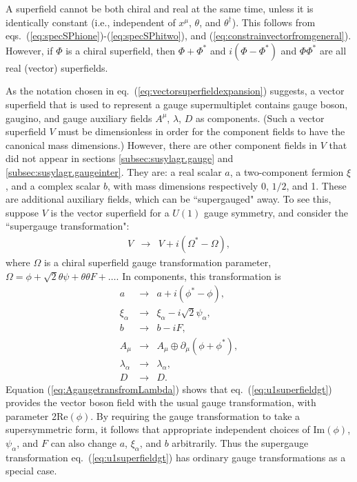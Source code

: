 \documentclass[12pt]{article}
\def\BDminus{-}
\def\BDminus{+}
\def\BDminus{\ominus}
\def\BDminus{\oplus}
\def\beq{\begin{eqnarray}}
\def\eeq{\end{eqnarray}}
\begin{document}
A superfield cannot be both chiral and real at the same time, 
unless it is identically constant (i.e., independent of $x^\mu$, $\theta$, 
and $\theta^\dagger$). This follows from 
eqs.~(\ref{eq:specSPhione})-(\ref{eq:specSPhitwo}), and
(\ref{eq:constrainvectorfromgeneral}).
However, if $\Phi$ is a chiral superfield, then $\Phi+\Phi^*$ and
$i (\Phi - \Phi^*)$ and $\Phi \Phi^*$ are all real (vector) superfields.

As the notation chosen in 
eq.~(\ref{eq:vectorsuperfieldexpansion}) suggests,
a vector superfield that is used to represent a gauge supermultiplet contains 
gauge boson, gaugino, and gauge auxiliary fields $A^\mu$, $\lambda$, $D$
as components. (Such a vector superfield $V$ must be dimensionless in order for the component fields to have the canonical mass dimensions.) 
However, there are other component fields in $V$ that did 
not appear in sections \ref{subsec:susylagr.gauge} and 
\ref{subsec:susylagr.gaugeinter}.
They are: a real scalar $a$, a two-component fermion $\xi$, 
and a complex scalar $b$, with mass dimensions
respectively 0, $1/2$, and 1. These are additional auxiliary fields, 
which can be ``supergauged" away.
To see this, suppose $V$ is the vector superfield for a $U(1)$ 
gauge symmetry, and consider the ``supergauge transformation":
\beq
V &\rightarrow & V + i (\Omega^* - \Omega),
\label{eq:u1superfieldgt}
\eeq
where $\Omega$ is a chiral superfield gauge transformation parameter,
$\Omega = \phi + \sqrt{2}\theta \psi + \theta\theta F+\ldots$. 
In components, this transformation is
\beq
a &\rightarrow& a + i (\phi^* - \phi),
\\
\xi_\alpha &\rightarrow& \xi_\alpha - i\sqrt{2} \psi_\alpha ,
\\
b &\rightarrow& b - iF ,
\\
A_\mu &\rightarrow& A_\mu \BDminus \partial_\mu (\phi + \phi^*) ,
\label{eq:AgaugetransfromLambda}
\\
\lambda_\alpha &\rightarrow& \lambda_\alpha ,
\\
D &\rightarrow& D.
\label{eq:DgaugetransfromLambda}
\eeq
Equation (\ref{eq:AgaugetransfromLambda}) 
shows that eq.~(\ref{eq:u1superfieldgt}) provides the vector 
boson field with the usual gauge transformation, with parameter 2Re$(\phi)$.
By requiring the gauge transformation to take a supersymmetric 
form, it follows that 
appropriate independent choices of 
Im$(\phi)$, $\psi_\alpha$, and $F$ can also change $a$, $\xi_\alpha$,
and $b$ arbitrarily.
Thus the supergauge transformation 
eq.~(\ref{eq:u1superfieldgt}) has ordinary gauge transformations as a 
special case. 
\end{document}
